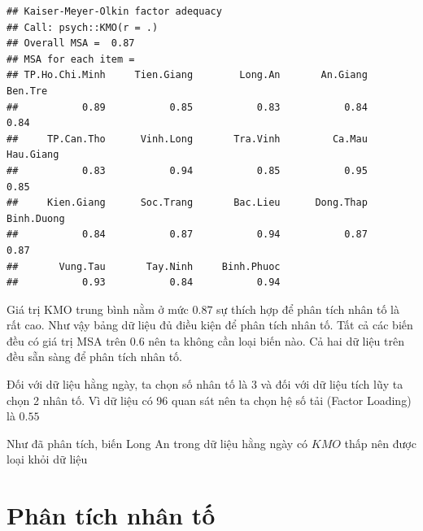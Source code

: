 \documentclass[../thesis.tex]{subfiles}
\begin{document}
\begin{verbatim}
## Kaiser-Meyer-Olkin factor adequacy
## Call: psych::KMO(r = .)
## Overall MSA =  0.87
## MSA for each item = 
## TP.Ho.Chi.Minh     Tien.Giang        Long.An       An.Giang        Ben.Tre 
##           0.89           0.85           0.83           0.84           0.84 
##     TP.Can.Tho      Vinh.Long       Tra.Vinh         Ca.Mau      Hau.Giang 
##           0.83           0.94           0.85           0.95           0.85 
##     Kien.Giang      Soc.Trang       Bac.Lieu      Dong.Thap     Binh.Duong 
##           0.84           0.87           0.94           0.87           0.87 
##       Vung.Tau       Tay.Ninh     Binh.Phuoc 
##           0.93           0.84           0.94
\end{verbatim}

Giá trị KMO trung bình nằm ở mức $ 0.87 $ sự thích hợp để phân tích nhân tố là rất cao. Như vậy bảng dữ liệu đủ điều kiện để phân tích nhân tố. Tất cả các biến đều có giá trị MSA trên $ 0.6 $ nên ta không cần loại biến nào. Cả hai dữ liệu trên đều sẵn sàng để phân tích nhân tố.

Đối với dữ liệu hằng ngày, ta chọn số nhân tố là 3 và đối với dữ liệu tích lũy ta chọn 2 nhân tố. Vì dữ liệu có 96 quan sát nên ta chọn hệ số tải (Factor Loading) là $ 0.55 $

Như đã phân tích, biến Long An trong dữ liệu hằng ngày có $ KMO $ thấp nên được loại khỏi dữ liệu 

\newpage

\section{Phân tích nhân tố}

\begin{Shaded}
	\begin{Highlighting}[]
\SpecialCharTok{\%\textgreater{}\%} \NormalTok{(}\SpecialCharTok{{-}}
		 
		 \NormalTok{) }\SpecialCharTok{\%\textgreater{}\%} 
		 \NormalTok{, }
		 \NormalTok{)}
	\end{Highlighting}
\end{Shaded}
\end{document}
